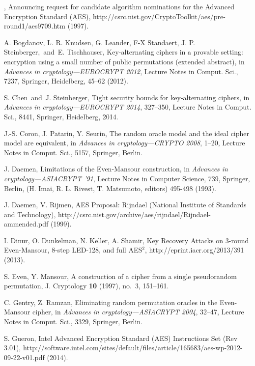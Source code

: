 \documentclass{llncs}
\begin{document}
\begin{thebibliography}{99}

 \textendash, Announcing request for candidate algorithm nominations for the Advanced Encryption Standard (AES),
http://csrc.nist.gov/CryptoToolkit/aes/pre-round1/aes\textunderscore 9709.htm (1997).

A. Bogdanov, L. R. Knudsen, G. Leander, F-X Standaert, J. P. Steinberger,\ and\ E. Tischhauser, Key-alternating ciphers in a provable setting: encryption using a small number of public permutations (extended abstract), in {\it Advances in cryptology---EUROCRYPT 2012}, Lecture Notes in Comput. Sci., 7237, Springer, Heidelberg, 45--62 (2012).

S. Chen\ and\  J. Steinberger, Tight security bounds for key-alternating ciphers, in {\it Advances in cryptology---EUROCRYPT 2014}, 327--350, Lecture Notes in Comput. Sci., 8441, Springer, Heidelberg, 2014.

J.-S. Coron, J. Patarin, Y. Seurin, The random oracle model and the ideal cipher model are equivalent, in {\it Advances in cryptology---CRYPTO 2008}, 1--20, Lecture Notes in Comput. Sci., 5157, Springer, Berlin. 

J. Daemen, Limitations of the Even-Mansour construction, in
{\it Advances in cryptology---ASIACRYPT '91}, Lecture Notes in Computer Science, 739, Springer, Berlin, (H. Imai, R. L. Rivest, T. Matsumoto, editors) 495-498 (1993).

J. Daemen, V. Rijmen, AES Proposal: Rijndael (National Institute of Standards and Technology),
http://csrc.nist.gov/archive/aes/rijndael/Rijndael-ammended.pdf (1999).

I. Dinur, O. Dunkelman, N. Keller, A. Shamir, Key Recovery Attacks on 3-round Even-Mansour, 8-step LED-128, and full AES$^2$, http://eprint.iacr.org/2013/391 (2013).

S. Even, Y. Mansour, A construction of a cipher from a single pseudorandom permutation, J. Cryptology {\bf 10} (1997), no.~3, 151--161.

C. Gentry, Z. Ramzan, Eliminating random permutation oracles in the Even-Mansour cipher, in {\it Advances in cryptology---ASIACRYPT 2004}, 32--47, Lecture Notes in Comput. Sci., 3329, Springer, Berlin.

S. Gueron, Intel Advanced Encryption Standard (AES) Instructions Set (Rev 3.01),
http://software.intel.com/sites/default/files/article/165683/aes-wp-2012-09-22-v01.pdf (2014).


\end{thebibliography}
\end{document}
